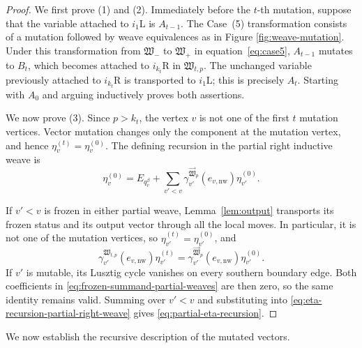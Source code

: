 \documentclass[12pt, reqno]{amsart}
\theoremstyle{plain}
\theoremstyle{definition}
\numberwithin{equation}{section}
\begin{document}
\begin{proof}
We first prove \textup{(1)} and \textup{(2)}. Immediately before the
\(t\)-th mutation, suppose that the variable attached to
\(i_1\mathrm L\) is \(A_{t-1}\). The Case~\textup{(5)}
transformation consists of a mutation followed by weave
equivalences as in Figure \ref{fig:weave-mutation}. Under this transformation from $\mathfrak W_-$ to $\mathfrak W_+$ in equation~\eqref{eq:case5}, \(A_{t-1}\) mutates to
\(B_t\), which becomes attached to \(i_{k_t}\mathrm R\) in $\mathfrak W_{t,p}$. The
unchanged variable previously attached to \(i_{k_t}\mathrm R\) is
transported to \(i_1\mathrm L\); this is precisely \(A_t\). Starting
with \(A_0\) and arguing inductively proves both assertions.

We now prove \textup{(3)}. Since \(p>k_t\), the vertex \(v\) is not
one of the first \(t\) mutation vertices. Vector mutation changes
only the component at the mutation vertex, and hence
\(\eta_v^{(t)}=\eta_v^{(0)}\). The defining recursion in the partial
right inductive weave is
\begin{equation}\label{eq:eta-recursion-partial-right-weave}
    \eta_v^{(0)}
    =E_{q_v^\beta}+
    \sum_{v'<v}
    \gamma_{v'}^{\overrightarrow{\mathfrak W}_p}
        (e_{v,\mathrm{nw}})\eta_{v'}^{(0)}.
\end{equation}

If \(v'<v\) is frozen in either partial weave, Lemma~\ref{lem:output}
transports its frozen status and its output vector through all the
local moves. In particular, it is not one of the mutation vertices,
so \(\eta_{v'}^{(t)}=\eta_{v'}^{(0)}\), and
\begin{equation}\label{eq:frozen-summand-partial-weaves}
    \gamma_{v'}^{\mathfrak W_{t,p}}
        (e_{v,\mathrm{nw}})\eta_{v'}^{(t)}
    =
    \gamma_{v'}^{\overrightarrow{\mathfrak W}_p}
        (e_{v,\mathrm{nw}})\eta_{v'}^{(0)}.
\end{equation}
If \(v'\) is mutable, its Lusztig cycle vanishes on every southern
boundary edge. Both coefficients in
\eqref{eq:frozen-summand-partial-weaves} are then zero, so the same
identity remains valid. Summing over \(v'<v\) and substituting into
\eqref{eq:eta-recursion-partial-right-weave} gives
\eqref{eq:partial-eta-recursion}.
\end{proof}

We now establish the recursive description of the mutated vectors.
\end{document}
